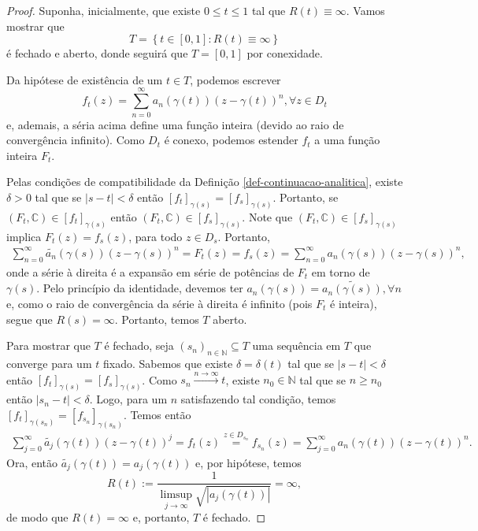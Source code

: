 \begin{proof}
Suponha, inicialmente, que existe $0\leq t\leq 1$ tal que $R(t)\equiv\infty$.
Vamos mostrar que
\begin{equation*}
    T = \left\{ t\in[0,1] : R(t)\equiv\infty \right\}
\end{equation*}
é fechado e aberto, donde seguirá que $T = [0,1]$ por conexidade.

Da hipótese de existência de um $t\in T$, podemos escrever
\begin{equation*}
    f_t(z) = \sum_{n=0}^\infty a_n(\gamma(t))(z - \gamma(t))^n, \forall z\in D_t
\end{equation*}
e, ademais, a séria acima define uma função inteira (devido ao raio de convergência
infinito). Como $D_t$ é conexo, podemos estender $f_t$ a uma função inteira $F_t$.

Pelas condições de compatibilidade da Definição \ref{def-continuacao-analitica},
existe $\delta > 0$ tal que se $|s-t|<\delta$ então 
$[f_t]_{\gamma(s)} = [f_s]_{\gamma(s)}$. Portanto, se
$(F_t,\mathbb{C}) \in [f_t]_{\gamma(s)}$ então $(F_t,\mathbb{C}) \in [f_s]_{\gamma(s)}$.
Note que $(F_t,\mathbb{C}) \in [f_s]_{\gamma(s)}$ implica $F_t(z) = f_s(z)$, para todo
$z\in D_s$. Portanto, 
\begin{align*}
    \sum_{n=0}^\infty \widetilde{a_n}(\gamma(s))(z-\gamma(s))^n 
    =
    F_t(z)
    =
    f_s(z)
    =
    \sum_{n=0}^\infty a_n(\gamma(s))(z-\gamma(s))^n,
\end{align*}
onde a série à direita é a expansão em série de potências de $F_t$ em torno 
de $\gamma(s)$. Pelo princípio da identidade, devemos ter 
$a_n(\gamma(s)) = \widetilde{a_n(\gamma(s))}, \forall n$ e, como o raio 
de convergência da série à direita é infinito (pois $F_t$ é inteira), segue
que $R(s) = \infty$. Portanto, temos $T$ aberto.

Para mostrar que $T$ é fechado, seja $(s_n)_{n\in\mathbb{N}}\subseteq T$ uma
sequência em $T$ que converge para um $t$ fixado. Sabemos que existe 
$\delta = \delta(t)$ tal que se $|s-t|<\delta$ então 
$[f_t]_{\gamma(s)} = [f_s]_{\gamma(s)}$. Como $s_n\xrightarrow{n\to\infty} t$,
existe $n_0\in\mathbb{N}$ tal que se $n\geq n_0$ então $|s_n - t|<\delta$.
Logo, para um $n$ satisfazendo tal condição, temos
$[f_t]_{\gamma(s_n)} = [f_{s_n}]_{\gamma(s_n)}$. Temos então
\begin{align*}
    \sum_{j=0}^\infty \widetilde{a_j}(\gamma(t))(z-\gamma(t))^j
    =
    f_t(z)
    \stackrel{z\in D_{s_n}}{=}
    f_{s_n}(z)
    =
    \sum_{j=0}^\infty a_n(\gamma(t))(z-\gamma(t))^n.
\end{align*}
Ora, então $\widetilde{a_j}(\gamma(t)) = a_j(\gamma(t))$ e, por hipótese, temos
\begin{equation*}
    R(t) := \frac{1}{\displaystyle{\limsup_{j\to\infty}} \sqrt{ |a_j(\gamma(t))| } } 
    = \infty,
\end{equation*}
de modo que $R(t) = \infty$ e, portanto, $T$ é fechado.


\end{proof}
